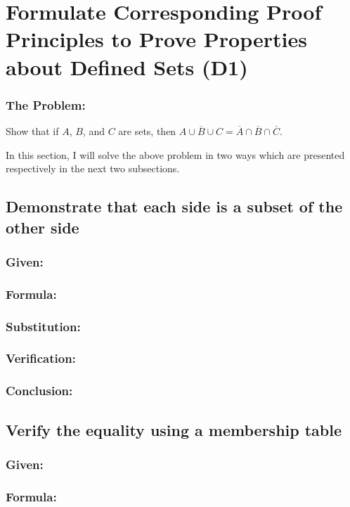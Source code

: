 \documentclass[12pt, a4paper, twoside]{report} %
\begin{document}
\section{Formulate Corresponding Proof Principles to Prove Properties about Defined Sets (D1)}
\label{sec:D1}

\subsubsection*{The Problem:}


Show that if $A$, $B$, and $C$ are sets, then $\overline{A \cup B \cup C} = \overline{A} \cap \overline{B} \cap \overline{C}$.

In this section, I will solve the above problem in two ways which are presented respectively in the next two subsections.

\subsection{Demonstrate that each side is a subset of the other side}
\subsubsection*{Given:}
\subsubsection*{Formula:}
\subsubsection*{Substitution:}
\subsubsection*{Verification:}
\subsubsection*{Conclusion:}

\subsection{Verify the equality using a membership table}
\subsubsection*{Given:}
\subsubsection*{Formula:}
\end{document}
